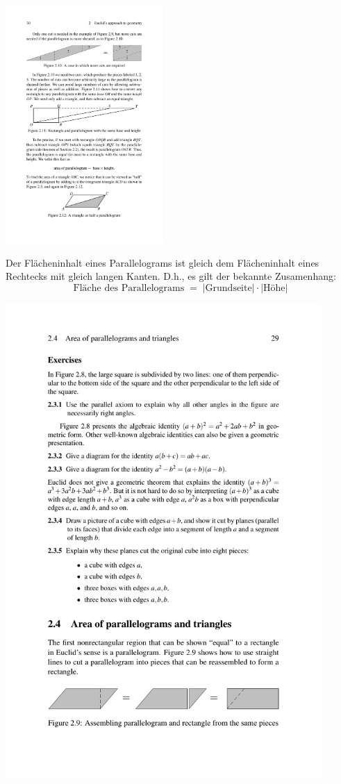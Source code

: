 \begin{center}
    \includegraphics[width=6cm]{BILDER/BildFlaecheDreieck.pdf}
\end{center}

Der Flächeninhalt eines Parallelograms ist gleich dem Flächeninhalt eines Rechtecks mit gleich
langen Kanten. D.h., es gilt der bekannte Zusamenhang:
$$
    \mbox{Fläche des Parallelograms} \; = \; |\mbox{Grundseite}| \cdot |\mbox{Höhe}|
$$

\begin{center}
    \includegraphics[width=12cm]{BILDER/BildFlaecheParallelogramm.pdf}
\end{center}

